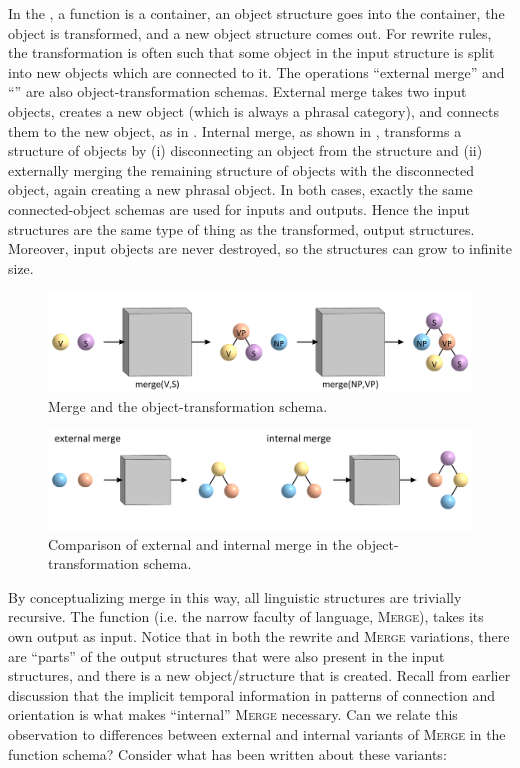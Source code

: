   In the , a function is a container, an object structure goes into the container, the object is transformed, and a new object structure comes out. For rewrite rules, the transformation is often such that some object in the input structure is split into new objects which are connected to it. The operations “external merge” and “” are also object-transformation schemas. External merge takes two input objects, creates a new object (which is always a phrasal category), and connects them to the new object, as in {}. Internal merge, as shown in {}, transforms a structure of objects by (i) disconnecting an object from the structure and (ii) externally merging the remaining structure of objects with the disconnected object, again creating a new phrasal object. In both cases, exactly the same connected-object schemas are used for inputs and outputs. Hence the input structures are the same type of thing as the transformed, output structures. Moreover, input objects are never destroyed, so the structures can grow to infinite size.

  
\begin{figure}
\includegraphics[width=\textwidth]{figures/Tilsen-img108.png}
\caption{Merge and the object-transformation schema.}
\label{fig:5:4}
\end{figure}
 
\begin{figure}
\includegraphics[width=\textwidth]{figures/Tilsen-img109.png}
\caption{Comparison of external and internal merge in the object-transformation schema.}
\label{fig:5:5}
\end{figure}

  By conceptualizing merge in this way, all linguistic structures are trivially recursive. The function (i.e. the narrow faculty of language, \textsc{Merge}), takes its own output as input. Notice that in both the rewrite and \textsc{Merge} variations, there are “parts” of the output structures that were also present in the input structures, and there is a new object/structure that is created. Recall from earlier discussion that the implicit temporal information in patterns of connection and orientation is what makes “internal” \textsc{Merge} necessary. Can we relate this observation to differences between external and internal variants of \textsc{Merge} in the function schema? Consider what has been written about these variants:

